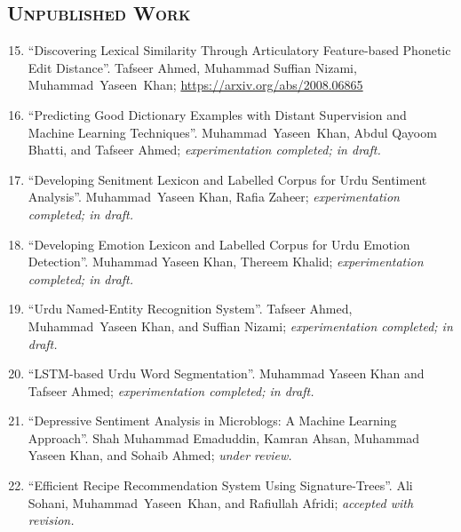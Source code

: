 \documentclass[a4paper, 10pt]{article}
\begin{document}
\subsection*{\normalfont\textsc{ Unpublished Work}}
\begin{enumerate}
\setcounter{enumi}{14}
\itemsep-4pt 

	\item ``Discovering Lexical Similarity Through Articulatory Feature-based Phonetic Edit Distance''. Tafseer Ahmed, Muhammad Suffian Nizami, \textcolor{NavyBlue}{Muhammad~Yaseen~Khan}; \url{https://arxiv.org/abs/2008.06865}
	
	\item ``Predicting Good Dictionary Examples with Distant Supervision and Machine Learning Techniques''. \textcolor{NavyBlue}{Muhammad~Yaseen~Khan}, Abdul Qayoom Bhatti, and Tafseer Ahmed; \emph{\small experimentation completed; in draft.}
	
	\item ``Developing Senitment Lexicon and Labelled Corpus for Urdu Sentiment Analysis''. \textcolor{NavyBlue}{Muhammad~Yaseen Khan}, Rafia Zaheer; \emph{\small experimentation completed; in draft.}
	
	\item ``Developing Emotion Lexicon and Labelled Corpus for Urdu Emotion Detection''. \textcolor{NavyBlue}{Muhammad Yaseen Khan}, Thereem Khalid; \emph{\small experimentation completed; in draft.}	

	\item ``Urdu Named-Entity Recognition System''. Tafseer Ahmed, \textcolor{NavyBlue}{Muhammad~Yaseen Khan}, and Suffian Nizami; \emph{\small experimentation completed; in draft.}
	
	\item ``LSTM-based Urdu Word Segmentation''. \textcolor{NavyBlue}{Muhammad Yaseen Khan} and Tafseer Ahmed; \emph{\small experimentation completed; in draft.}
	
	\item ``Depressive Sentiment Analysis in Microblogs: A Machine Learning Approach''. Shah Muhammad Emaduddin, Kamran Ahsan, \textcolor{NavyBlue}{Muhammad Yaseen Khan}, and Sohaib Ahmed; \emph{\small under review.}
	
	\item ``Efficient Recipe Recommendation System Using Signature-Trees''. Ali Sohani, \textcolor{NavyBlue}{Muhammad~Yaseen~Khan}, and Rafiullah Afridi; 
	\emph{\small accepted with revision.}
	

\end{enumerate}
\end{document}

